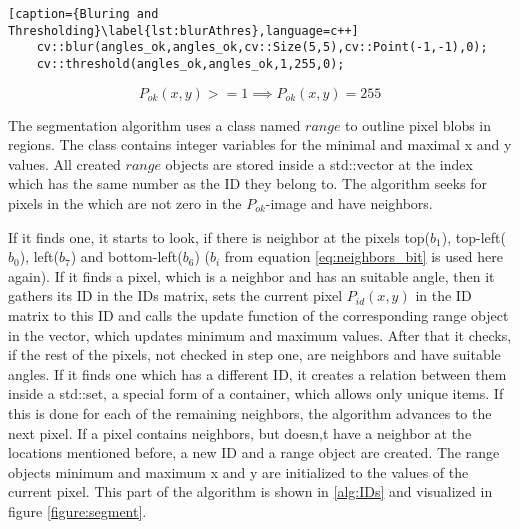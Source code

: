 \begin{lstlisting}[caption={Bluring and Thresholding}\label{lst:blurAthres},language=c++]
	cv::blur(angles_ok,angles_ok,cv::Size(5,5),cv::Point(-1,-1),0);
	cv::threshold(angles_ok,angles_ok,1,255,0);
\end{lstlisting}

\begin{equation}
	P_{ok}(x,y)>=1 \implies P_{ok}(x,y)=255
	\label{eq:thresholdSeg}
\end{equation}


The segmentation algorithm uses a class named $range$ to outline pixel blobs in regions. The class contains integer 
variables for the minimal and maximal x and y values. All created $range$ objects are stored inside  
a std::vector at the index which has the same number as the ID they belong to. 
The algorithm seeks for pixels in the which are not zero in the $P_{ok}$-image and have neighbors.

If it finds one, it starts to look, if there is neighbor at the pixels top($b_1$), top-left($b_0$), 
left($b_7$) and bottom-left($b_6$) ($b_i$ from equation \vref{eq:neighbors_bit} is used here again).
If it finds a pixel, which is a neighbor and has an suitable angle, then it gathers its ID in the IDs matrix, 
sets the current pixel $P_{id}(x,y)$ in the ID matrix to this ID and calls the update function of the corresponding 
range object in the vector, which updates minimum and maximum values. After that it checks, 
if the rest of the pixels, not checked in step one, are neighbors and have suitable angles. 
If it finds one which has a different ID, it creates a relation between 
them inside a std::set, a special form of a container, which allows only unique items. 
If this is done for each of the remaining 
neighbors, the algorithm advances to the next pixel. If a pixel contains neighbors, but doesn,t have a neighbor at the locations
mentioned before, a new ID and a range object are created. The range objects minimum and maximum x and y are initialized 
to the values of the current pixel. This part of the algorithm is shown in \vref{alg:IDs} 
and visualized in figure \vref{figure:segment}.

